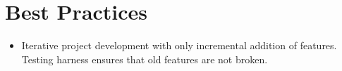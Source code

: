 \section{Best Practices}
\begin{itemize}
\item Iterative project development with only incremental addition of features. Testing harness ensures that old features are not broken.
\end{itemize}
\nocite{Judd.2011, Wilson.2014, Bourque.2014, Schlesinger.1979}


